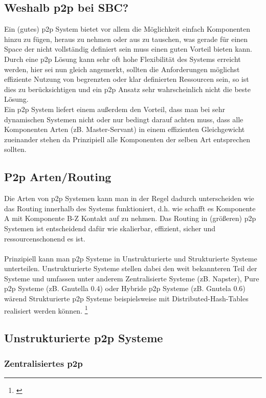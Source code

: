 \documentclass[a4paper,12pt]{scrreprt}
\begin{document}
			\subsection{Weshalb p2p bei SBC?}
				
				Ein (gutes) p2p System bietet vor allem die Möglichkeit einfach Komponenten hinzu zu fügen, heraus zu nehmen oder aus zu tauschen, was gerade für einen Space der nicht vollständig definiert sein muss einen guten Vorteil bieten kann. Durch eine p2p Lösung kann sehr oft hohe Flexibilität des Systems erreicht werden, hier sei nun gleich angemerkt, sollten die Anforderungen möglichst effiziente Nutzung von begrenzten oder klar definierten Ressourcen sein, so ist dies zu berücksichtigen und ein p2p Ansatz sehr wahrscheinlich nicht die beste Lösung. \\
				Ein p2p System liefert einem außerdem den Vorteil, dass man bei sehr dynamischen Systemen nicht oder nur bedingt darauf achten muss, dass alle Komponenten Arten (zB. Master-Servant) in einem effizienten Gleichgewicht zueinander stehen da Prinzipiell alle Komponenten der selben Art entsprechen sollten.
				
			\subsection{P2p Arten/Routing}
			
				Die Arten von p2p Systemen kann man in der Regel dadurch unterscheiden wie das Routing innerhalb des Systems funktioniert, d.h. wie schafft es Komponente A mit Komponente B-Z Kontakt auf zu nehmen. Das Routing in (größeren) p2p Systemen ist entscheidend dafür wie skalierbar, effizient, sicher und ressourcenschonend es ist.
				\\\\Prinzipiell kann man p2p Systeme in Unstrukturierte und Strukturierte Systeme unterteilen. Unstrukturierte Systeme stellen dabei den weit bekannteren Teil der Systeme und umfassen unter anderem Zentralisierte Systeme (zB. Napster), Pure p2p Systeme (zB. Gnutella 0.4) oder Hybride p2p Systeme (zB. Gnutela 0.6) wärend Strukturierte p2p Systeme beispielsweise mit Distributed-Hash-Tables realisiert werden können. \footnote{\cite{Steinmetz2005}}
				
			\subsection{Unstrukturierte p2p Systeme}
				\subsubsection{Zentralisiertes p2p}
					
\end{document}
